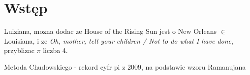\documentclass[11pt, wide, leqno]{mwart}
\begin{document}
\maketitle
\tableofcontents

\section{Wstęp}\label{sec:ws}

Luiziana, mozna dodac ze House of the Rising Sun jest o New Orleans $\in$ Louisiana, i ze \emph{Oh, mother, tell your children / Not to do what I have done}, przyblizac $\pi$ liczba 4.

Metoda Chudowskiego - rekord cyfr pi z 2009, na podstawie wzoru Ramanujana


\end{document}
